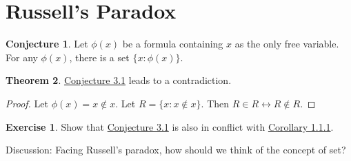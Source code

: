 \documentclass[11pt]{article}
\theoremstyle{definition}
\newtheorem{exer}{Exercise}
\newtheorem{theorem}{Theorem}[section]
\newtheorem{conj}[theorem]{Conjecture}
\begin{document}
\section{Russell's Paradox}

\begin{conj} \label{Conjecture 3.1}
Let $\phi (x)$ be a formula containing $x$ as the only free variable. For any $\phi(x)$, there is a set $\{ x: \phi(x) \}$.
\end{conj}

\begin{theorem}
\hyperref [Conjecture 3.1] {Conjecture 3.1} leads to a contradiction.
\end{theorem}

\begin{proof}
Let $\phi(x) = x \notin x$. Let $R=\{x:x \notin x\}$. Then $R \in R \leftrightarrow R \notin R$.
\end{proof}

\begin{exer}
Show that \hyperref [Conjecture 3.1] {Conjecture 3.1} is also in conflict with \hyperref [Corollary 1.1.1] {Corollary 1.1.1}.
\end{exer}

\noindent
Discussion: Facing Russell's paradox, how should we think of the concept of set?
\end{document}
